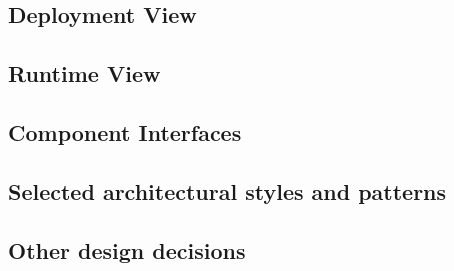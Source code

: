 \subsection{Deployment View}
\newpage
\subsection{Runtime View}
\newpage
\subsection{Component Interfaces}
\newpage
\subsection{Selected architectural styles and patterns}
\newpage
\subsection{Other design decisions}
\newpage